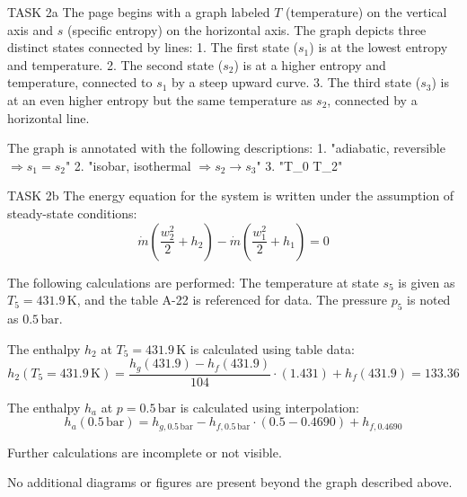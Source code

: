 TASK 2a  
The page begins with a graph labeled \( T \) (temperature) on the vertical axis and \( s \) (specific entropy) on the horizontal axis. The graph depicts three distinct states connected by lines:  
1. The first state (\( s_1 \)) is at the lowest entropy and temperature.  
2. The second state (\( s_2 \)) is at a higher entropy and temperature, connected to \( s_1 \) by a steep upward curve.  
3. The third state (\( s_3 \)) is at an even higher entropy but the same temperature as \( s_2 \), connected by a horizontal line.  

The graph is annotated with the following descriptions:  
1. "adiabatic, reversible \( \Rightarrow s_1 = s_2 \)"  
2. "isobar, isothermal \( \Rightarrow s_2 \rightarrow s_3 \)"  
3. "T_0 \rightarrow T_2"  

TASK 2b  
The energy equation for the system is written under the assumption of steady-state conditions:  
\[
\dot{m} \left( \frac{w_2^2}{2} + h_2 \right) - \dot{m} \left( \frac{w_1^2}{2} + h_1 \right) = 0
\]  

The following calculations are performed:  
The temperature at state \( s_5 \) is given as \( T_5 = 431.9 \, \text{K} \), and the table A-22 is referenced for data. The pressure \( p_5 \) is noted as \( 0.5 \, \text{bar} \).  

The enthalpy \( h_2 \) at \( T_5 = 431.9 \, \text{K} \) is calculated using table data:  
\[
h_2(T_5 = 431.9 \, \text{K}) = \frac{h_{g}(431.9) - h_{f}(431.9)}{104} \cdot (1.431) + h_{f}(431.9) = 133.36
\]  

The enthalpy \( h_a \) at \( p = 0.5 \, \text{bar} \) is calculated using interpolation:  
\[
h_a(0.5 \, \text{bar}) = h_{g,0.5 \, \text{bar}} - h_{f,0.5 \, \text{bar}} \cdot (0.5 - 0.4690) + h_{f,0.4690}
\]  

Further calculations are incomplete or not visible.  

No additional diagrams or figures are present beyond the graph described above.
